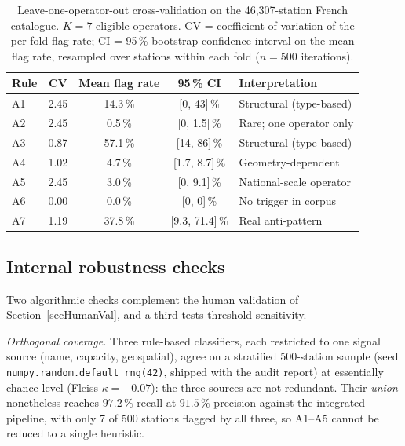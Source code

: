 \documentclass[11pt,a4paper]{article}
\begin{document}
\begin{table}[!htbp]
\centering
\caption{Leave-one-operator-out cross-validation on the 46{,}307-station
French catalogue. $K = 7$ eligible operators. CV = coefficient of
variation of the per-fold flag rate; CI = 95\,\% bootstrap confidence
interval on the mean flag rate, resampled over stations within each
fold ($n = 500$ iterations).}
\label{tab:looo}
\small
\begin{tabular}{@{}lcccl@{}}
\toprule
\textbf{Rule} & \textbf{CV} & \textbf{Mean flag rate}
              & \textbf{95\,\% CI} & \textbf{Interpretation}\\
\midrule
A1 & 2.45 & 14.3\,\% & [0, 43]\,\%       & Structural (type-based) \\
A2 & 2.45 &  0.5\,\% & [0, 1.5]\,\%      & Rare; one operator only \\
A3 & 0.87 & 57.1\,\% & [14, 86]\,\%      & Structural (type-based) \\
A4 & 1.02 &  4.7\,\% & [1.7, 8.7]\,\%    & Geometry-dependent \\
A5 & 2.45 &  3.0\,\% & [0, 9.1]\,\%      & National-scale operator \\
A6 & 0.00 &  0.0\,\% & [0, 0]\,\%        & No trigger in corpus \\
A7 & 1.19 & 37.8\,\% & [9.3, 71.4]\,\%   & Real anti-pattern \\
\bottomrule
\end{tabular}
\end{table}


\subsection{Internal robustness checks}\label{secInternal}
Two algorithmic checks complement the human validation of
Section~\ref{secHumanVal}, and a third tests threshold sensitivity.

\emph{Orthogonal coverage.} Three rule-based classifiers, each
restricted to one signal source (name, capacity, geospatial), agree on
a stratified 500-station sample (seed
\texttt{numpy.random.default\_rng(42)}, shipped with the audit report)
at essentially chance level (Fleiss $\kappa = -0.07$): the three
sources are not redundant. Their \emph{union} nonetheless reaches
$97.2\,\%$ recall at $91.5\,\%$ precision against the integrated
pipeline, with only 7 of 500 stations flagged by all three, so A1--A5
cannot be reduced to a single heuristic.
\end{document}
